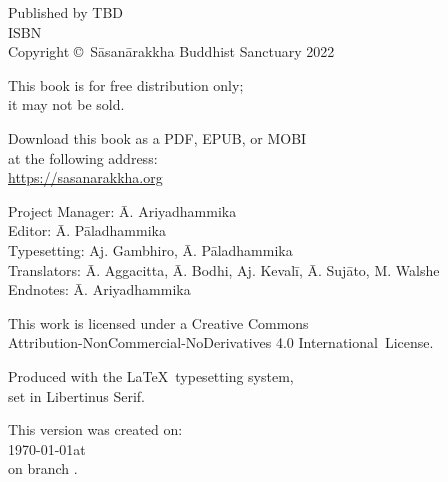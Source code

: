 \cleartoverso
\thispagestyle{empty}

\vspace*{-\baselineskip}

{%

\fontsize{10}{16}\selectfont
\centering
\setlength{\parindent}{0pt}%

\vspace{0.5cm}

Published by TBD\\
ISBN \theISBN\\
Copyright \copyright\ Sāsanārakkha Buddhist Sanctuary 2022

\vspace{0.5cm}

This book is for free distribution only;\\
it may not be sold.

\vspace{0.5cm}

Download this book as a PDF, EPUB, or MOBI\\
at the following address:\\
\href{https://sasanarakkha.org/}{https://sasanarakkha.org}

\vspace{0.5cm}

Project Manager: Ā. Ariyadhammika\\
Editor: Ā. Pāladhammika\\
Typesetting: Aj. Gambhiro, Ā. Pāladhammika\\
Translators: Ā. Aggacitta, Ā. Bodhi, Aj. Kevalī, Ā. Sujāto, M. Walshe\\
Endnotes: Ā. Ariyadhammika

\vspace{0.5cm}

This work is licensed under a Creative Commons\\
Attribution-NonCommercial-NoDerivatives 4.0 International~License.

Produced with the \LaTeX\ typesetting system,\\
set in Libertinus Serif.

\vspace{0.5cm}

\ifdesktopversion
This version was created on:\\
\today \space at \currenttime\\
\href{https://github.com/sasanarakkha/pali-english-recitations/commits/main}{\texttt{\commit}} on branch \texttt{\branch}.
\fi

\vspace{0.5cm}


\theEditionInfo

}
